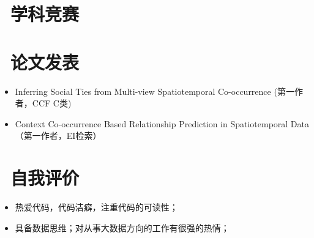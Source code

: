 \documentclass{resume}
\begin{document}
\section{\faStarO\ 学科竞赛}
\medskip


\section{\faLanguage\ 论文发表}
\begin{itemize}[parsep=0.5ex]
  \item Inferring Social Ties from Multi-view Spatiotemporal Co-occurrence (第一作者，CCF C类)
  \item Context Co-occurrence Based Relationship Prediction in Spatiotemporal Data （第一作者，EI检索）
\end{itemize}
\medskip



\section{\faLightbulbO\  自我评价}
\begin{itemize}[parsep=0.5ex]
  \item 热爱代码，代码洁癖，注重代码的可读性；
  \item 具备数据思维；对从事大数据方向的工作有很强的热情；
\end{itemize}
\medskip



%
%
\end{document}
